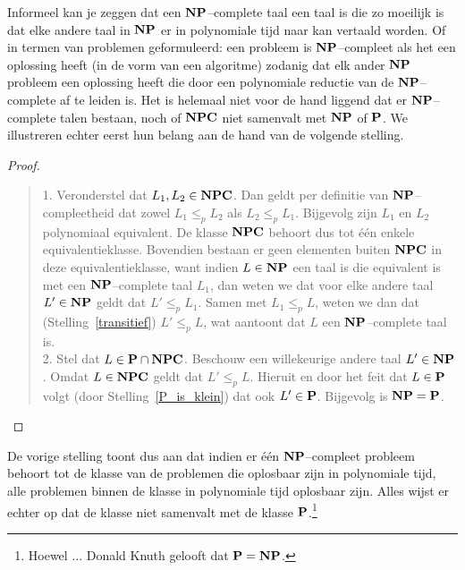 Informeel kan je zeggen dat een
$\NP$--complete taal een taal is die zo moeilijk is dat elke andere
taal in $\NP$ er in polynomiale tijd naar kan vertaald worden. Of in
termen van problemen geformuleerd: een probleem is $\NP$--compleet als
het een oplossing heeft (in de vorm van een algoritme) zodanig dat elk
ander $\NP$ probleem een oplossing heeft die door een polynomiale
reductie van de $\NP$--complete af te leiden is. Het is helemaal
niet voor de hand liggend dat er $\NP$--complete talen bestaan, noch
of $\NPC$ niet samenvalt met $\NP$ of $\P$.  We illustreren echter
eerst hun belang aan de hand van de volgende stelling.

\begin{proof} ~~
\begin{verse}
1. Veronderstel dat $L_1,L_2\in\NPC$. Dan geldt per definitie van
  $\NP$--com\-pleet\-heid dat zowel $L_1 \leq_p L_2$ als $L_2 \leq_p
  L_1$. Bijgevolg zijn $L_1$ en $L_2$ polynomiaal equivalent. De
  klasse $\NPC$ behoort dus tot \'e\'en enkele
  equivalentieklasse. Bovendien bestaan er geen elementen buiten
  $\NPC$ in deze equivalentieklasse, want indien $L\in\NP$ een taal is
  die equivalent is met een $\NP$--complete taal $L_1$, dan weten we
  dat voor elke andere taal $L'\in \NP$ geldt dat $L' \leq_p
  L_1$. Samen met $L_1 \leq_p L$, weten we dan dat
(Stelling~\ref{transitief}) $L' \leq_p L$, wat aantoont dat $L$ een
$\NP$--complete taal is. \\[2mm]
2. Stel dat $L\in\P \cap\NPC$. Beschouw een willekeurige andere taal
$L'\in \NP$. Omdat $L\in\NPC$ geldt dat $L' \leq_p L$. Hieruit en door
het feit dat $L\in\P$ volgt (door Stelling~\ref{P_is_klein}) dat ook
$L'\in \P$. Bijgevolg is $\NP=\P$.
\end{verse}
\end{proof}

De vorige stelling toont dus aan dat indien er \'e\'en $\NP$--compleet
probleem behoort tot de klasse van de problemen die oplosbaar zijn in
polynomiale tijd, alle problemen binnen de klasse \NP in polynomiale
tijd oplosbaar zijn. Alles wijst er echter op dat de klasse \NP niet
samenvalt met de klasse $\P$.\footnote{Hoewel ... Donald Knuth gelooft dat
$\P = \NP$.}


